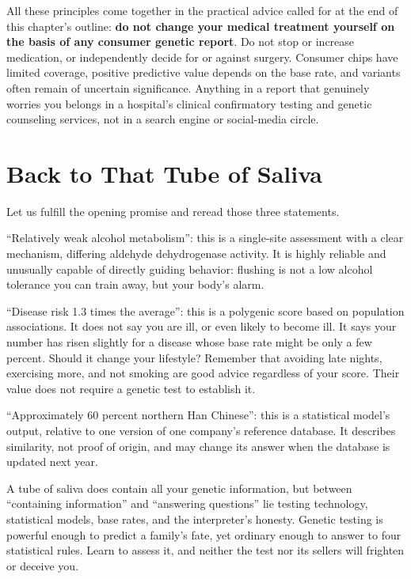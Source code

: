 All these principles come together in the practical advice called for at the end of this chapter's outline: \textbf{do not change your medical treatment yourself on the basis of any consumer genetic report}. Do not stop or increase medication, or independently decide for or against surgery. Consumer chips have limited coverage, positive predictive value depends on the base rate, and variants often remain of uncertain significance. Anything in a report that genuinely worries you belongs in a hospital's clinical confirmatory testing and genetic counseling services, not in a search engine or social-media circle.

\section{Back to That Tube of Saliva}

Let us fulfill the opening promise and reread those three statements.

``Relatively weak alcohol metabolism'': this is a single-site assessment with a clear mechanism, differing aldehyde dehydrogenase activity. It is highly reliable and unusually capable of directly guiding behavior: flushing is not a low alcohol tolerance you can train away, but your body's alarm.

``Disease risk 1.3 times the average'': this is a polygenic score based on population associations. It does not say you are ill, or even likely to become ill. It says your number has risen slightly for a disease whose base rate might be only a few percent. Should it change your lifestyle? Remember that avoiding late nights, exercising more, and not smoking are good advice regardless of your score. Their value does not require a genetic test to establish it.

``Approximately 60 percent northern Han Chinese'': this is a statistical model's output, relative to one version of one company's reference database. It describes similarity, not proof of origin, and may change its answer when the database is updated next year.

A tube of saliva does contain all your genetic information, but between ``containing information'' and ``answering questions'' lie testing technology, statistical models, base rates, and the interpreter's honesty. Genetic testing is powerful enough to predict a family's fate, yet ordinary enough to answer to four statistical rules. Learn to assess it, and neither the test nor its sellers will frighten or deceive you.

